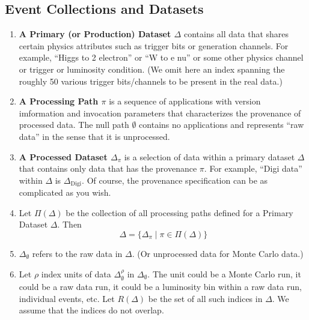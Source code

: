 \documentclass[pdftex]{cmspaper}
\begin{document}
{\subsection{Event Collections and Datasets}

\begin{enumerate}

\item {\bf A Primary (or Production) Dataset $\Delta$} 
      contains all data that shares certain physics attributes such as
      trigger bits or generation channels.  For example, ``Higgs to
      2 electron'' or ``W to e nu'' or some other physics channel or
      trigger or luminosity condition.  (We omit here an index spanning
      the roughly 50 various trigger bits/channels to be present in the
      real data.)

\item {\bf A Processing Path $\pi$} is a sequence of applications
      with version imformation and invocation parameters that characterizes
      the provenance of processed data.  The null path $\emptyset$ contains
      no applications and represents ``raw data'' in the sense that it is
      unprocessed.

\item {\bf A Processed Dataset $\Delta_{\pi}$} is a selection of data within 
      a primary dataset $\Delta$ that contains only data that has the 
      provenance $\pi$.  For example, ``Digi data'' within $\Delta$ is 
      $\Delta_{\mbox{Digi}}$.  Of course, the provenance specification can 
      be as complicated as you wish.

\item Let $\Pi(\Delta)$ be the collection of all processing paths defined for a Primary 
Dataset $\Delta $.  Then 
\begin{equation}
    \Delta = \{ \Delta_{\pi} \mid \pi \in \Pi(\Delta) \}
\end{equation}

\item $\Delta_{\emptyset}$ refers to the raw data in $\Delta$. (Or unprocessed data for 
Monte Carlo data.) 

\item Let $\rho$ index units of data $\Delta_{\emptyset}^{\rho}$ 
      in $\Delta_{\emptyset}$.  The unit could be a Monte Carlo run,
      it could be a raw data run, it could be a luminosity bin within
      a raw data run, individual events, etc.  Let $R(\Delta)$ be the
      set of all such indices in $\Delta$.  We assume that the indices
      do not overlap.


\end{enumerate}}
\end{document}
